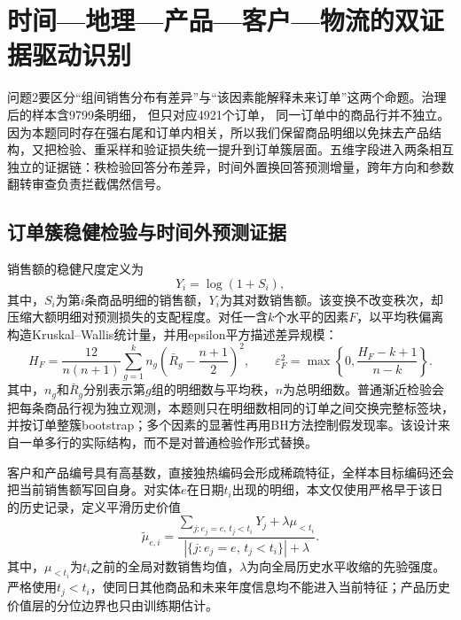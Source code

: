 \section{时间—地理—产品—客户—物流的双证据驱动识别}

问题2要区分“组间销售分布有差异”与“该因素能解释未来订单”这两个命题。治理后的样本含9799条明细，%
但只对应4921个订单，%
同一订单中的商品行并不独立。因为本题同时存在强右尾和订单内相关，所以我们保留商品明细以免抹去产品结构，又把检验、重采样和验证损失统一提升到订单簇层面。五维字段进入两条相互独立的证据链：秩检验回答分布差异，时间外置换回答预测增量，跨年方向和参数翻转审查负责拦截偶然信号。

\subsection{订单簇稳健检验与时间外预测证据}

销售额的稳健尺度定义为
\begin{equation}
    Y_i=\log(1+S_i),
    \label{eq:q2_log_sales}
\end{equation}
其中，$S_i$为第$i$条商品明细的销售额，$Y_i$为其对数销售额。该变换不改变秩次，却压缩大额明细对预测损失的支配程度。对任一含$k$个水平的因素$F$，以平均秩偏离构造Kruskal--Wallis统计量\cite{kruskal1952ranks}，并用epsilon平方描述差异规模：
\begin{equation}
    H_F=\frac{12}{n(n+1)}\sum_{g=1}^{k}n_g
    \left(\bar R_g-\frac{n+1}{2}\right)^2,
    \qquad
    \varepsilon_F^2=\max\left\{0,\frac{H_F-k+1}{n-k}\right\}.
    \label{eq:q2_rank_effect}
\end{equation}
其中，$n_g$和$\bar R_g$分别表示第$g$组的明细数与平均秩，$n$为总明细数。普通渐近检验会把每条商品行视为独立观测，本题则只在明细数相同的订单之间交换完整标签块，并按订单整簇bootstrap；多个因素的显著性再用BH方法控制假发现率\cite{benjamini1995fdr}。该设计来自一单多行的实际结构，而不是对普通检验作形式替换。

客户和产品编号具有高基数，直接独热编码会形成稀疏特征，全样本目标编码还会把当前销售额写回自身。对实体$e$在日期$t_i$出现的明细，本文仅使用严格早于该日的历史记录，定义平滑历史价值
\begin{equation}
    \widetilde{\mu}_{e,i}
    =\frac{\sum_{j:e_j=e,\,t_j<t_i}Y_j
    +\lambda\mu_{<t_i}}
    {\left|\{j:e_j=e,\,t_j<t_i\}\right|+\lambda}.
    \label{eq:q2_history_encoding}
\end{equation}
其中，$\mu_{<t_i}$为$t_i$之前的全局对数销售均值，$\lambda$为向全局历史水平收缩的先验强度。严格使用$t_j<t_i$，使同日其他商品和未来年度信息均不能进入当前特征；产品历史价值层的分位边界也只由训练期估计。

